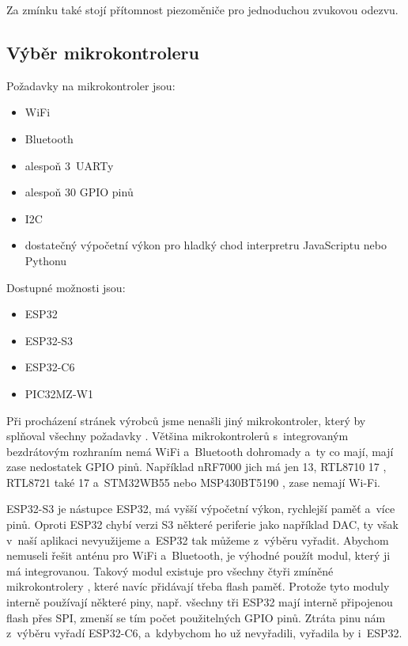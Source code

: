 Za zmínku také stojí přítomnost piezoměniče pro jednoduchou zvukovou odezvu. 

\subsection{Výběr mikrokontroleru \label{subs:vyberMikrokontroleru}}
Požadavky na mikrokontroler jsou:
\begin{itemize}
    \item WiFi
    \item Bluetooth
    \item alespoň 3~UARTy
    \item alespoň 30 GPIO pinů
    \item I2C
    \item dostatečný výpočetní výkon pro hladký chod interpretru JavaScriptu nebo Pythonu
\end{itemize}

Dostupné možnosti jsou:
\begin{itemize}
    \item ESP32                 \cite{ESP32}
    \item ESP32-S3              \cite{ESP32S3}
    \item ESP32-C6              \cite{ESP32C6}
    \item PIC32MZ-W1            \cite{PIC32MZ}
\end{itemize}
Při procházení stránek výrobců jsme nenašli jiný mikrokontroler, který by splňoval všechny požadavky \cite{NordicWiFi}.
Většina mikrokontrolerů s~integrovaným bezdrátovým rozhraním nemá WiFi a~Bluetooth dohromady a~ty co mají, mají zase nedostatek GPIO pinů.
Například nRF7000 \cite{nRF7000} jich má jen 13, RTL8710 17 \cite{RTL8710}, RTL8721 \cite{RTL8721DM} také 17 a~STM32WB55 \cite{STM32WB55} nebo MSP430BT5190 \cite{MSP430BT5190}, zase nemají Wi-Fi.

ESP32-S3 je nástupce ESP32, má vyšší výpočetní výkon, rychlejší paměť a~více pinů.
Oproti ESP32 chybí verzi S3 některé periferie jako například DAC, ty však v~naší aplikaci nevyužijeme a~ESP32 tak můžeme z~výběru vyřadit.
Abychom nemuseli řešit anténu pro WiFi a~Bluetooth, je výhodné použít modul, který ji má integrovanou.
Takový modul existuje pro všechny čtyři zmíněné mikrokontrolery \cite{ESP32-WROOM}\cite{ESP32S3-WROOM}\cite{ESP32C6-WROOM}\cite{WFI32E01PC}, které navíc přidávají třeba flash paměť.
Protože tyto moduly interně používají některé piny, např. všechny tři ESP32 mají interně připojenou flash přes SPI, zmenší se tím počet použitelných GPIO pinů.
Ztráta pinu nám z~výběru vyřadí ESP32-C6, a~kdybychom ho už nevyřadili, vyřadila by i~ESP32.

